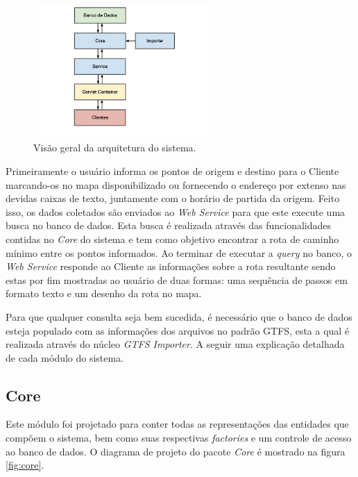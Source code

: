 \begin{figure}[!htb]
	\centering
	\includegraphics[width=0.6\textwidth]{./arquitetura.jpg}
	\caption[Arquitetura do sistema]{Visão geral da arquitetura do sistema.}
	\label{fig:arquitetura}
\end{figure}

Primeiramente o usuário informa os pontos de origem e destino para o Cliente marcando-os no mapa disponibilizado ou fornecendo o endereço por extenso nas devidas caixas de texto, juntamente com o horário de partida da origem.
Feito isso, os dados coletados são enviados ao \emph{Web Service} para que este execute uma busca no banco de dados. 
Esta busca é realizada através das funcionalidades contidas no \emph{Core} do sistema e tem como objetivo encontrar a rota de caminho mínimo entre os pontos informados.
Ao terminar de executar a \emph{query} no banco, o \emph{Web Service} responde ao Cliente as informações sobre a rota resultante sendo estas por fim mostradas ao usuário de duas formas: uma sequência de passos em formato texto e um desenho da rota no mapa.

Para que qualquer consulta seja bem sucedida, é necessário que o banco de dados esteja populado com as informações dos arquivos no padrão GTFS, esta a qual é realizada através do núcleo \emph{GTFS Importer}.
A seguir uma explicação detalhada de cada módulo do sistema.

\subsection{Core}
Este módulo foi projetado para conter todas as representações das entidades que compõem o sistema, bem como suas respectivas \emph{factories} e um controle de acesso ao banco de dados.
O diagrama de projeto do pacote \emph{Core} é mostrado na figura \ref{fig:core}.

